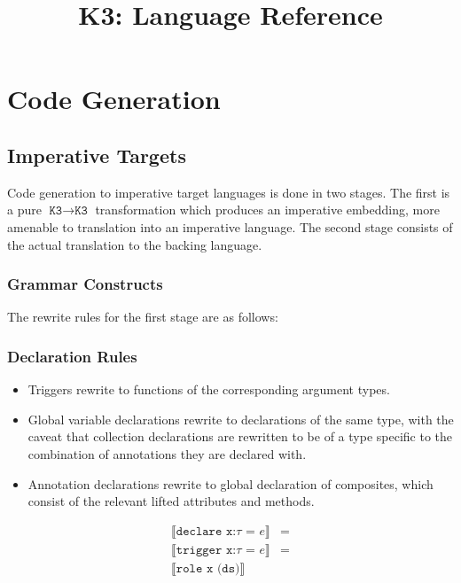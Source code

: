 \documentclass{article}
\title{K3: Language Reference}
\author{}
\date{}
\newcommand{\K}{\texttt{K3}}
\newcommand{\intI}[1]{\llbracket\texttt{#1}\rrbracket}
\begin{document}
    \maketitle

    \tableofcontents

    \section{Code Generation}
    \subsection{Imperative Targets}

    Code generation to imperative target languages is done in two stages. The first is a pure $\K
    \rightarrow \K$ transformation which produces an imperative embedding, more amenable to
    translation into an imperative language. The second stage consists of the actual translation to
    the backing language.

    \subsubsection{Grammar Constructs}

    The rewrite rules for the first stage are as follows:

    \subsubsection{Declaration Rules}

    \begin{itemize}
        \item Triggers rewrite to functions of the corresponding argument types.
        \item Global variable declarations rewrite to declarations of the same type, with the caveat
            that collection declarations are rewritten to be of a type specific to the combination
            of annotations they are declared with.
        \item Annotation declarations rewrite to global declaration of composites, which consist of
            the relevant lifted attributes and methods.
    \end{itemize}

    \begin{align}
        \intI{declare x:$\tau$ = $e$} &= \\
        \intI{trigger x:$\tau$ = $e$} &= \\
        \intI{role x (ds)}
    \end{align}
\end{document}
